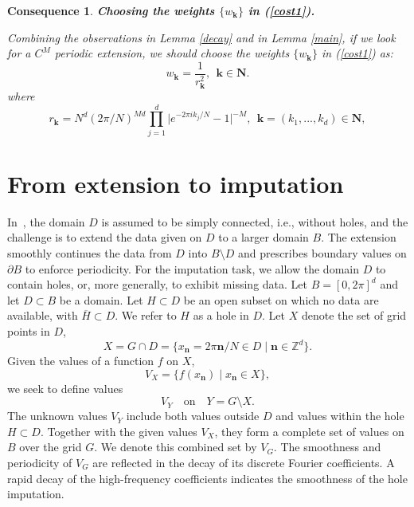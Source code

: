 \documentclass[11pt,oneside,reqno]{amsart}
\theoremstyle{plain}
\newtheorem{consequence}[theorem]{Consequence}
\numberwithin{equation}{section}
\begin{document}
\begin{consequence}\label{consequence2}{\bf Choosing the weights $\{w_{\mathbf{k}}\}$ in (\ref{cost1}).}

\medskip
Combining the observations in Lemma \ref{decay} and in Lemma \ref{main}, if we look for a $C^M$ periodic extension, we should choose the
weights $\{w_{\mathbf{k}}\}$ in (\ref{cost1}) as:
\begin{equation}\label{wk2}
w_{\mathbf{k}}=\frac{1}{r^2_{\mathbf{k}}},\ \ \mathbf{k}\in\mathbf{N}.
\end{equation}
where
\begin{equation}\label{rk2}
r_{\mathbf{k}}=N^d(2\pi/N)^{Md}
\prod_{j=1}^d
\bigl|e^{-2\pi i k_j/N}-1\bigr|^{-M} ,\ \ \mathbf{k}=(k_1,...,k_d)\in\mathbf{N},
\end{equation}
\end{consequence}

\section{\bf From extension to imputation}

In~\cite{GL10}, the domain $D$ is assumed to be simply connected,
i.e., without holes, and the challenge is to extend the data given on $D$
to a larger domain $B$. The extension smoothly continues the data from $D$ into $B\setminus D$
and prescribes boundary values on $\partial B$ to enforce periodicity. For the imputation task, we allow the domain $D$ to contain holes,
or, more generally, to exhibit missing data.
Let $B=[0,2\pi]^d$  
and let $D \subset B$ be a domain.  
Let $H \subset D$ be an open subset  
on which no data are available,  
with $\overline{H} \subset D$.  
We refer to $H$ as a hole in $D$. 
Let $X$ denote the set of grid points in $D$,
\[
X = G \cap D
= \{x_{\mathbf n} = 2\pi \mathbf n / N \in D
\;|\; \mathbf n \in \mathbb{Z}^d\}.
\]
Given the values of a function $f$ on $X$,
\[
V_X = \{ f(x_{\mathbf n}) \;|\; x_{\mathbf n} \in X \},
\]
we seek to define values
\[
V_Y \quad \text{on} \quad Y = G \setminus X.
\]
The unknown values $V_Y$ include both values
outside $D$ and values within the hole $H \subset D$.
Together with the given values $V_X$,
they form a complete set of values on $B$
over the grid $G$.
We denote this combined set by $V_G$.  
The smoothness and periodicity of $V_G$  
are reflected in the decay  
of its discrete Fourier coefficients.  
A rapid decay  
of the high-frequency coefficients indicates the smoothness 
of the hole imputation.
\end{document}
